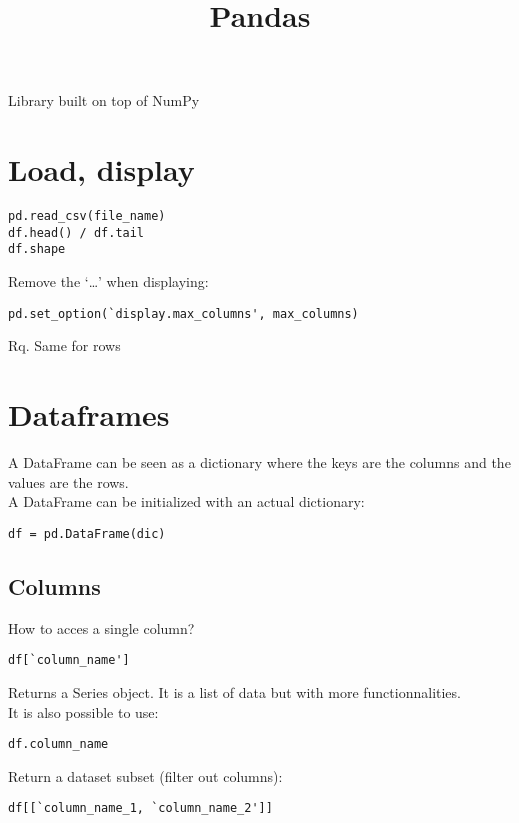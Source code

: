 \documentclass[french]{article}
\title{Pandas}
\begin{document}
\date{}

\maketitle

\setlength{\parindent}{0cm}

Library built on top of NumPy

\section{Load, display}

\begin{verbatim}
pd.read_csv(file_name)
df.head() / df.tail
df.shape
\end{verbatim}

Remove the `\ldots' when displaying:
\begin{verbatim}
pd.set_option(`display.max_columns', max_columns)
\end{verbatim}
Rq. Same for rows

\section{Dataframes}

A DataFrame can be seen as a dictionary where the keys are the columns and the values are the rows.\\
A DataFrame can be initialized with an actual dictionary:
\begin{verbatim}
df = pd.DataFrame(dic)
\end{verbatim}

\subsection{Columns}

How to acces a single column?
\begin{verbatim}
df[`column_name']
\end{verbatim}
Returns a Series object. It is a list of data but with more functionnalities.\\
It is also possible to use:
\begin{verbatim}
df.column_name
\end{verbatim}
Return a dataset subset (filter out columns):
\begin{verbatim}
df[[`column_name_1, `column_name_2']]
\end{verbatim}
\end{document}
